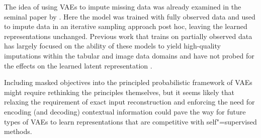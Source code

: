 The idea of using VAEs to impute missing data was already examined in the seminal paper by \textcite{rezende_stochastic_2014}. Here the model was trained with fully observed data and used to impute data in an iterative sampling approach post hoc, leaving the learned representations unchanged.
Previous work that trains on partially observed data has largely focused on the ability of these models to yield high-quality imputations within the tabular and image data domains and have not probed for the effects on the learned latent representation \parencite{mattei_miwae_2019, ipsen_not-miwae_2021}. 

Including masked objectives into the principled probabilistic framework of VAEs might require rethinking the principles themselves, but it seems likely that relaxing the requirement of exact input reconstruction and enforcing the need for encoding (and decoding) contextual information could pave the way for future types of VAEs to learn representations that are competitive with self"=supervised methods.














